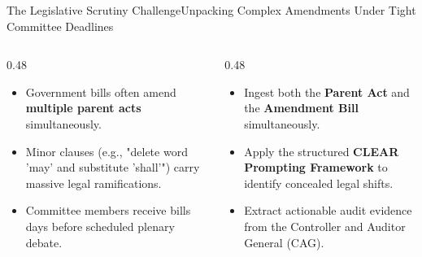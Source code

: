 \documentclass[aspectratio=169, 10pt]{beamer}
\begin{document}
\begin{frame}{The Legislative Scrutiny Challenge}{Unpacking Complex Amendments Under Tight Committee Deadlines}
  \begin{columns}[c]
    \begin{column}{0.48\textwidth}
      \begin{tcolorbox}[colback=lightgrey, colframe=tanzaniablue, arc=1.5mm, boxrule=0.8pt, title=\textbf{The Committee Scrutiny Trap}]
        \small
        \begin{itemize}
          \item Government bills often amend \textcolor{tanzaniablue}{\textbf{multiple parent acts}} simultaneously.
          \item Minor clauses (e.g., "delete word 'may' and substitute 'shall'") carry massive legal ramifications.
          \item Committee members receive bills days before scheduled plenary debate.
        \end{itemize}
      \end{tcolorbox}
    \end{column}
    \begin{column}{0.48\textwidth}
      \begin{tcolorbox}[colback=calloutbg, colframe=suagreen, arc=1.5mm, boxrule=0.8pt, title=\textbf{The AI-Powered Solution}]
        \small
        \begin{itemize}
          \item Ingest both the \textcolor{suagreen}{\textbf{Parent Act}} and the \textcolor{tanzaniablue}{\textbf{Amendment Bill}} simultaneously.
          \item Apply the structured \textcolor{darkcharcoal}{\textbf{CLEAR Prompting Framework}} to identify concealed legal shifts.
          \item Extract actionable audit evidence from the Controller and Auditor General (CAG).
        \end{itemize}
      \end{tcolorbox}
    \end{column}
  \end{columns}
\end{frame}
\end{document}
